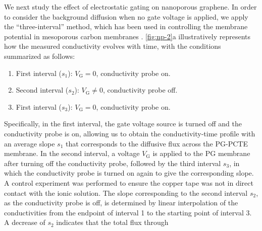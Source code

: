 We next study the effect of electrostatic gating on nanoporous graphene. 
In order to consider the background diffusion when no gate voltage is
applied, we apply the ``three-interval'' method, which has been used in
controlling the membrane potential in mesoporous carbon membranes
\cite{Surwade_2014_carbon_electrochemical_ion}.
%
\autoref{fig:np-2}a illustratively represents how the measured
conductivity evolves with time, with the conditions summarized as
follows:
\begin{enumerate}
\item First interval ($s_{1}$): $V_{\mathrm{G}} = 0$, conductivity probe on.
  
\item Second interval ($s_{2}$): $V_{\mathrm{G}} \neq 0$, conductivity probe off.

  \item First interval ($s_{3}$): $V_{\mathrm{G}} = 0$, conductivity probe on.
\end{enumerate}
Specifically, in the first interval,
the gate voltage source is turned off and the conductivity probe is
on, allowing us to obtain the conductivity-time profile with an
average slope $s_{1}$ that corresponds to the diffusive flux across
the PG-PCTE membrane. In the second interval, a voltage
$V_{\mathrm{G}}$ is applied to the PG membrane after turning off the
conductivity probe, followed by the third interval $s_{3}$, in which
the conductivity probe is turned on again to give the corresponding
slope. A control experiment was performed to ensure the copper tape
was not in direct contact with the ionic solution.
%
The slope corresponding to the
second interval $s_{2}$, as the conductivity probe is off, is
determined by linear interpolation of the conductivities from the
endpoint of interval 1 to the starting point of interval 3. A decrease
of $s_{2}$ indicates that the total flux through
